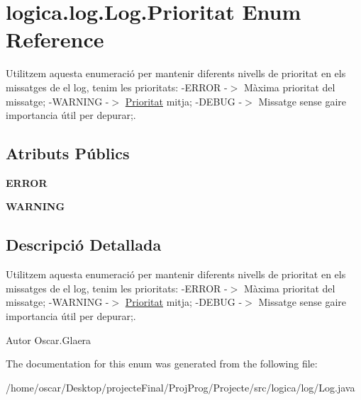 \hypertarget{enumlogica_1_1log_1_1_log_1_1_prioritat}{\section{logica.\+log.\+Log.\+Prioritat Enum Reference}
\label{enumlogica_1_1log_1_1_log_1_1_prioritat}
}


Utilitzem aquesta enumeració per mantenir diferents nivells de prioritat en els missatges de el log, tenim les prioritats\+: -\/\+E\+R\+R\+O\+R -\/$>$ Màxima prioritat del missatge; -\/\+W\+A\+R\+N\+I\+N\+G -\/$>$ \hyperlink{enumlogica_1_1log_1_1_log_1_1_prioritat}{Prioritat} mitja; -\/\+D\+E\+B\+U\+G -\/$>$ Missatge sense gaire importancia útil per depurar;.  


\subsection*{Atributs Públics}
\begin{DoxyCompactItemize}
\item 
\hypertarget{enumlogica_1_1log_1_1_log_1_1_prioritat_a49b9e8d2031abe0079c6b7f1dd8be14c}{{\bfseries E\+R\+R\+O\+R}}\label{enumlogica_1_1log_1_1_log_1_1_prioritat_a49b9e8d2031abe0079c6b7f1dd8be14c}

\item 
\hypertarget{enumlogica_1_1log_1_1_log_1_1_prioritat_a4e0b9c526ad5892cf4f3d76a11e6b79b}{{\bfseries W\+A\+R\+N\+I\+N\+G}}\label{enumlogica_1_1log_1_1_log_1_1_prioritat_a4e0b9c526ad5892cf4f3d76a11e6b79b}

\end{DoxyCompactItemize}


\subsection{Descripció Detallada}
Utilitzem aquesta enumeració per mantenir diferents nivells de prioritat en els missatges de el log, tenim les prioritats\+: -\/\+E\+R\+R\+O\+R -\/$>$ Màxima prioritat del missatge; -\/\+W\+A\+R\+N\+I\+N\+G -\/$>$ \hyperlink{enumlogica_1_1log_1_1_log_1_1_prioritat}{Prioritat} mitja; -\/\+D\+E\+B\+U\+G -\/$>$ Missatge sense gaire importancia útil per depurar;. 

\begin{DoxyAuthor}{Autor}
Oscar.\+Glaera 
\end{DoxyAuthor}


The documentation for this enum was generated from the following file\+:\begin{DoxyCompactItemize}
\item 
/home/oscar/\+Desktop/projecte\+Final/\+Proj\+Prog/\+Projecte/src/logica/log/Log.\+java\end{DoxyCompactItemize}
